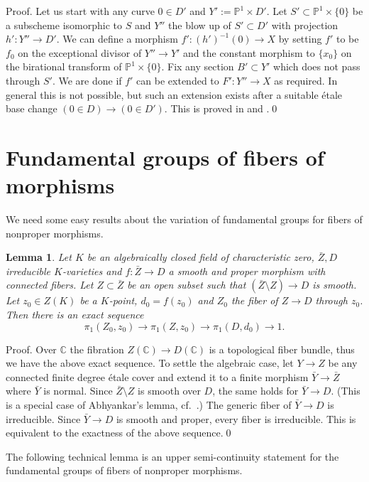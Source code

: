\documentclass[12pt,twoside]{amsart}
\renewcommand{\c}[0]{{\mathbb C}}
\newcommand{\p}[0]{{\mathbb P}}
\newtheorem{lem}[thm]{Lemma}
\theoremstyle{definition}
\theoremstyle{remark}
\begin{document}
Proof. Let us start with any curve $0\in D'$ and
$Y':=\p^1\times D'$. Let $S'\subset \p^1\times \{0\}$ be a subscheme
isomorphic to $S$ and   $Y''$   the blow up of $S'\subset D'$
with projection $h':Y''\to D'$. We can define a morphism
$f':(h')^{-1}(0)\to X$ by setting $f'$ to be $f_0$
on the exceptional divisor of $Y''\to Y'$ and the constant morphism
 to $\{x_0\}$
on the birational transform of $\p^1\times \{0\}$. 
Fix any section $B'\subset Y'$ which does not pass through $S'$. 
We are done if $f'$ can be extended to $F':Y''\to X$
as required. In general this is not possible, but
 such an extension exists after
a suitable \'etale base change $(0\in D)\to (0\in D')$. 
This is proved in \cite[1.2]{kmm2} and \cite[2.2]{rcloc}.\qed

\section{Fundamental groups of fibers of morphisms}

We need some easy results about the variation of fundamental groups
for fibers of nonproper morphisms.


\begin{lem}\label{open.fibr.lem}
 Let $K$ be an algebraically closed 
 field of characteristic zero, $\bar Z,D$  irreducible
$K$-varieties and $f:\bar Z\to D$ a smooth and proper morphism with
 connected fibers. Let $Z\subset \bar Z$ be an open subset
such that $(\bar Z\setminus Z)\to D$ is smooth. 
Let $z_0\in Z(K)$  be a $K$-point, $d_0=f(z_0)$ and $Z_0$ the fiber of
$Z\to D$ through $z_0$.
Then there is an exact sequence
$$
\pi_1(Z_0,z_0)\to \pi_1(Z,z_0)\to \pi_1(D,d_0)\to 1.
$$
\end{lem} 


Proof. Over $\c$ the fibration $Z(\c)\to D(\c)$
is a topological fiber bundle, thus we have the above exact
sequence. To settle the algebraic case, let $Y\to Z$ be any
connected 
finite degree \'etale cover and extend it to a finite morphism
$\bar Y\to \bar Z$ where $\bar Y$ is normal. Since
$\bar Z\setminus Z$ is smooth over $D$, the same holds for
$\bar Y\to D$. 
(This is a special case of Abhyankar's lemma,
cf.\ \cite[XIII.5.2]{sga1}.)
The generic fiber of $\bar Y\to D$
is irreducible. Since $\bar Y\to D$
 is smooth and proper, every fiber is irreducible.
This is equivalent to the exactness of the above sequence.\qed
\medskip


The following technical lemma is an upper semi-continuity
statement for the fundamental groups of fibers of nonproper
morphisms.
\end{document}
